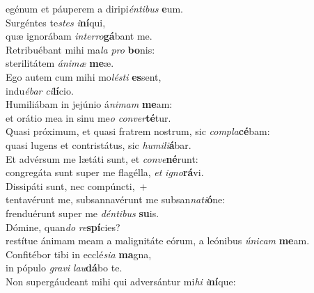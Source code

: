 \evenverse egénum et páuperem a diripi\textit{én}\textit{ti}\textit{bus} \textbf{e}um.\\
\oddverse Surgéntes te\textit{stes} \textit{i}\textbf{ní}qui,~\*\\
\oddverse quæ ignorábam \textit{in}\textit{ter}\textit{ro}\textbf{gá}bant me.\\
\evenverse Retribuébant mihi ma\textit{la} \textit{pro} \textbf{bo}nis:~\*\\
\evenverse sterilitátem \textit{á}\textit{ni}\textit{mæ} \textbf{me}æ.\\
\oddverse Ego autem cum mihi mo\textit{lé}\textit{sti} \textbf{es}sent,~\*\\
\oddverse indu\textit{é}\textit{bar} \textit{ci}\textbf{lí}cio.\\
\evenverse Humiliábam in jejúnio á\textit{ni}\textit{mam} \textbf{me}am:~\*\\
\evenverse et orátio mea in sinu me\textit{o} \textit{con}\textit{ver}\textbf{té}tur.\\
\oddverse Quasi próximum, et quasi fratrem nostrum, sic \textit{com}\textit{pla}\textbf{cé}bam:~\*\\
\oddverse quasi lugens et contristátus, sic \textit{hu}\textit{mi}\textit{li}\textbf{á}bar.\\
\evenverse Et advérsum me lætáti sunt, et \textit{con}\textit{ve}\textbf{né}runt:~\*\\
\evenverse congregáta sunt super me flagélla, \textit{et} \textit{i}\textit{gno}\textbf{rá}vi.\\
\oddverse Dissipáti sunt, nec compúncti,~+\\
\oddverse  tentavérunt me, subsannavérunt me subsan\textit{na}\textit{ti}\textbf{ó}ne:~\*\\
\oddverse frenduérunt super me \textit{dén}\textit{ti}\textit{bus} \textbf{su}is.\\
\evenverse Dómine, quan\textit{do} \textit{re}\textbf{spí}cies?~\*\\
\evenverse restítue ánimam meam a malignitáte eórum, a leónibus \textit{ú}\textit{ni}\textit{cam} \textbf{me}am.\\
\oddverse Confitébor tibi in ecclé\textit{si}\textit{a} \textbf{ma}gna,~\*\\
\oddverse in pópulo \textit{gra}\textit{vi} \textit{lau}\textbf{dá}bo te.\\
\evenverse Non supergáudeant mihi qui adversántur mi\textit{hi} \textit{i}\textbf{ní}que:~\*\\
